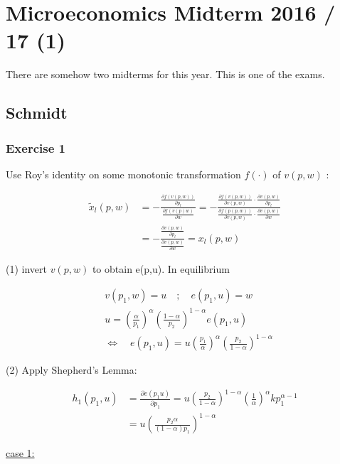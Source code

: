 \section{Microeconomics Midterm 2016 / 17 (1)}

There are somehow two midterms for this year. This is one of the exams.

{
\subsection*{Schmidt}

\subsubsection*{Exercise 1}

\begin{enumerate}[label=(\alph*)]
{\item 
Use Roy's identity on some monotonic transformation $f(\cdot)$ of $v(p, w)$ :

$$
\begin{aligned}
\tilde{x}_{l}(p, w) & =-\frac{\frac{\partial f(v(p, w))}{\partial p_{l}}}{\frac{\partial f(v(p) w)}{\partial w}}=-\frac{\frac{\partial f(v(p, w))}{\partial v(p, w)} \cdot \frac{\partial v(p, w)}{\partial p_{l}}}{\frac{\partial f(p(p, w))}{\partial v(p, w)} \cdot \frac{\partial v(p, w)}{\partial w}} \\
& =-\frac{\frac{\partial v(p, w)}{\partial p_{l}}}{\frac{\partial v(p, w)}{\partial w}}=x_{l}(p, w)
\end{aligned}
$$
}
{\item 
(1) invert $v(p, w)$ to obtain e(p,u). In equilibrium

$$
\begin{aligned}
& v\left(p_{1}, w\right)=u \quad ; \quad e\left(p_{1}, u\right)=w \\
& u=\left(\frac{\alpha}{p_{1}}\right)^{\alpha}\left(\frac{1-\alpha}{p_{2}}\right)^{1-\alpha} e\left(p_{1}, u\right) \\
& \Leftrightarrow \quad e\left(p_{1}, u\right)=u\left(\frac{p_{1}}{\alpha}\right)^{\alpha}\left(\frac{p_{2}}{1-\alpha}\right)^{1-\alpha}
\end{aligned}
$$

(2) Apply Shepherd's Lemma:

$$
\begin{aligned}
h_{1}\left(p_{1}, u\right) & =\frac{\partial e\left(p_{1} u\right)}{\partial p_{1}}=u\left(\frac{p_{2}}{1-\alpha}\right)^{1-\alpha}\left(\frac{1}{\alpha}\right)^{\alpha} k p_{1}^{\alpha-1} \\
& =u\left(\frac{p_{2} \alpha}{(1-\alpha) p_{1}}\right)^{1-\alpha}
\end{aligned}
$$
}
{\item 
\underline{case 1:}

}
\end{enumerate}}
